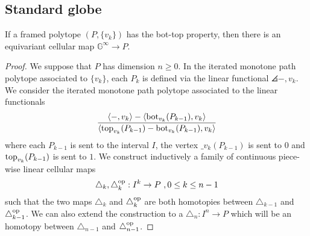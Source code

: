 \subsection{Standard globe}


\begin{theorem}
	\label{thm:map-from-the-globe}
	If a framed polytope $(P,\{v_k\})$ has the bot-top property, then there is an equivariant cellular map $\mathbb{G}^\infty \to P$.
\end{theorem}

\begin{proof}
	We suppose that $P$ has dimension $n\geq 0$.
	In the iterated monotone path polytope associated to $\{v_k\}$, each $P_k$ is defined via the linear functional $\angles{-,v_k}$.
	We consider the iterated monotone path polytope associated to the linear functionals
	\begin{equation} \label{eq:new-projection}
		\frac{\langle-,v_k\rangle-\langle\operatorname{bot}_{v_k}(P_{k-1}),v_k\rangle}{\langle\operatorname{top}_{v_k}(P_{k-1})-\operatorname{bot}_{v_k}(P_{k-1}),v_k\rangle}
	\end{equation}
	where each $P_{k-1}$ is sent to the interval $I$, the vertex $\bm_{v_k}(P_{k-1})$ is sent to $0$ and $\operatorname{top}_{v_k}(P_{k-1})$ is sent to $1$.
	We construct inductively a family of continuous piece-wise linear cellular maps
	\[
	\triangle_k, \triangle_k^{\mathrm{op}}: I^k \to P \ , 0 \leq k \leq n-1
	\]
	such that the two maps $\triangle_k$ and $\triangle_k^{\mathrm{op}}$ are both homotopies between $\triangle_{k-1}$ and $\triangle_{k-1}^{\mathrm{op}}$.
	We can also extend the construction to a $\triangle_n : I^n \to P$ which will be an homotopy between $\triangle_{n-1}$ and $\triangle_{n-1}^{\mathrm{op}}$.


\end{proof}

